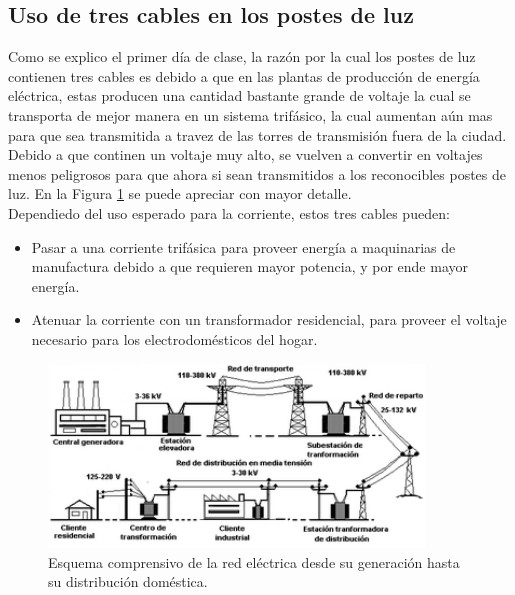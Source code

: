 \documentclass[letterpaper, 12pt]{article}
\begin{document}
\begin{justify}
        \section{Uso de tres cables en los postes de luz}
        \justify
        Como se explico el primer día de clase, la razón por la cual los postes de luz contienen tres cables es debido a que en las plantas de producción de energía eléctrica, estas producen una cantidad bastante grande de voltaje la cual se transporta de mejor manera en un sistema trifásico, la cual aumentan aún mas para que sea transmitida
        a travez de las torres de transmisión fuera de la ciudad. Debido a que continen un voltaje muy alto, se vuelven a convertir en voltajes menos peligrosos para que ahora si sean transmitidos a los reconocibles postes de luz. En la Figura \ref{fig:grid} se puede apreciar con mayor detalle.
        \\ 
        \newline
        Dependiedo del uso esperado para la corriente, estos tres cables pueden:
        \begin{itemize}
            \item Pasar a una corriente trifásica para proveer energía a maquinarias de manufactura debido a que requieren mayor potencia, y por ende mayor energía.
            \item Atenuar la corriente con un transformador residencial, para proveer el voltaje necesario para los electrodomésticos del hogar.
        \end{itemize}
        \begin{figure}[ht]
            \centering
            \label{fig:grid}
            \includegraphics[width=10cm]{themgrid.png}
            \caption{Esquema comprensivo de la red eléctrica desde su generación hasta su distribución doméstica.}
        \end{figure}

\end{justify}
\end{document}
